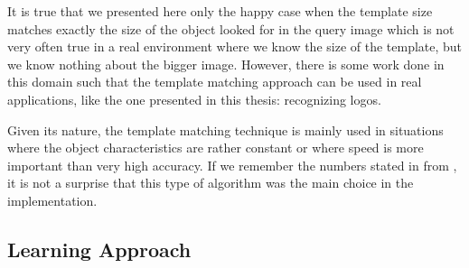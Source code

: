 It is true that we presented here only the happy case when the template size
matches exactly the size of the object looked for in the query image which is
not very often true in a real environment where we know the size of the
template, but we know nothing about the bigger image. However, there is some
work done in this domain \cite{fast-ccorr} \cite{phase-angle} such that the
template matching approach can be used in real applications, like the one
presented in this thesis: recognizing logos.

Given its nature, the template matching technique is mainly used in situations
where the object characteristics are rather constant or where speed is more
important than very high accuracy. If we remember the numbers stated in
 from ,
it is not a surprise that this type of algorithm was the main choice in the implementation.


\subsection{Learning Approach}
